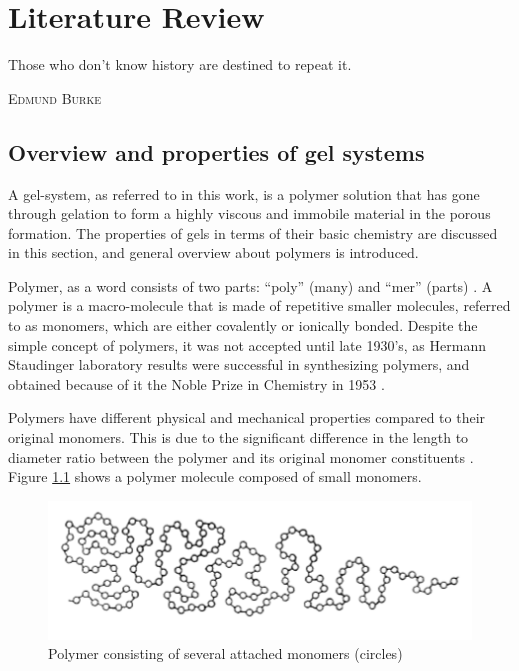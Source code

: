 \chapter{Literature Review}
\vspace*{\fill}
\epigraph{Those who don't know history are destined to repeat it.}%
{\textsc{Edmund Burke}}
\clearpage{\thispagestyle{empty}\cleardoublepage}


\section{Overview and properties of gel systems}

A gel-system, as referred to in this work, is a polymer solution that has gone through gelation to form a highly viscous and immobile material in the porous formation. The properties of gels in terms of their basic chemistry are discussed in this section, and general overview about polymers is introduced.

Polymer, as a word consists of two parts: “poly” (many) and “mer” (parts) . A polymer is a macro-molecule that is made of repetitive smaller molecules, referred to as monomers, which are either covalently or ionically bonded. Despite the simple concept of polymers, it was not accepted until late 1930’s, as Hermann Staudinger laboratory results were successful in synthesizing polymers, and obtained because of it the Noble Prize in Chemistry in 1953 \citep{Roberts1977}.

Polymers have different physical and mechanical properties compared to their original
monomers. This is due to the significant difference in the length to diameter ratio between the polymer and its original monomer constituents \citep{Ghosh2006}. Figure \ref{fig:polymer} shows a polymer molecule composed of small monomers.

\begin{figure}
    \centering
    \includegraphics[width=\textwidth]{img/fig/polymer.png}
    \caption{Polymer consisting of several attached monomers (circles) \citep{Ghosh2006}}
    \label{fig:polymer} %
\end{figure}

